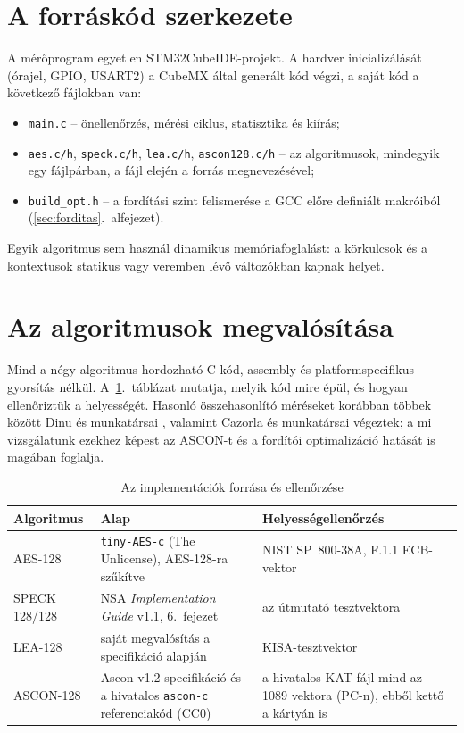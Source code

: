 \documentclass[a4paper,12pt]{report}
\theoremstyle{definition}
\theoremstyle{remark}
\begin{document}
\section{A forráskód szerkezete}

A mérőprogram egyetlen STM32CubeIDE-projekt. A hardver inicializálását (órajel, GPIO, USART2) a CubeMX által generált kód végzi, a saját kód a következő fájlokban van:

\begin{itemize}
	\item \texttt{main.c} -- önellenőrzés, mérési ciklus, statisztika és kiírás;
	\item \texttt{aes.c/h}, \texttt{speck.c/h}, \texttt{lea.c/h}, \texttt{ascon128.c/h} -- az algoritmusok, mindegyik egy fájlpárban, a fájl elején a forrás megnevezésével;
	\item \texttt{build\_opt.h} -- a fordítási szint felismerése a GCC előre definiált makróiból (\ref{sec:forditas}.~alfejezet).
\end{itemize}

Egyik algoritmus sem használ dinamikus memóriafoglalást: a körkulcsok és a kontextusok statikus vagy veremben lévő változókban kapnak helyet.

\section{Az algoritmusok megvalósítása}\label{sec:megvalositas}

Mind a négy algoritmus hordozható C-kód, assembly és platformspecifikus gyorsítás nélkül. A~\ref{tab:forrasok}.~táblázat mutatja, melyik kód mire épül, és hogyan ellenőriztük a helyességét. Hasonló összehasonlító méréseket korábban többek között Dinu és munkatársai \cite{Dinu2015}, valamint Cazorla és munkatársai \cite{Cazorla2013} végeztek; a mi vizsgálatunk ezekhez képest az ASCON-t és a fordítói optimalizáció hatását is magában foglalja.

\begin{table}[htbp]
    \centering
    \small
    \caption{Az implementációk forrása és ellenőrzése}
    \label{tab:forrasok}
    \begin{tabularx}{\textwidth}{|l|X|X|}
        \hline
        \textbf{Algoritmus} & \textbf{Alap} & \textbf{Helyességellenőrzés} \\ \hline
        AES-128 & \texttt{tiny-AES-c} \cite{TinyAES} (The Unlicense), AES-128-ra szűkítve & NIST SP~800-38A, F.1.1 ECB-vektor \cite{SP80038A} \\ \hline
        SPECK 128/128 & NSA \emph{Implementation Guide} v1.1, 6.~fejezet \cite{Beaulieu2019} & az útmutató tesztvektora \\ \hline
        LEA-128 & saját megvalósítás a specifikáció alapján \cite{Hong2013,Lee2014} & KISA-tesztvektor \cite{KISALEA} \\ \hline
        ASCON-128 & Ascon v1.2 specifikáció \cite{Dobraunig2021} és a hivatalos \texttt{ascon-c} referenciakód \cite{AsconC} (CC0) & a hivatalos KAT-fájl mind az 1089 vektora (PC-n), ebből kettő a kártyán is \\ \hline
    \end{tabularx}
\end{table}
\end{document}
